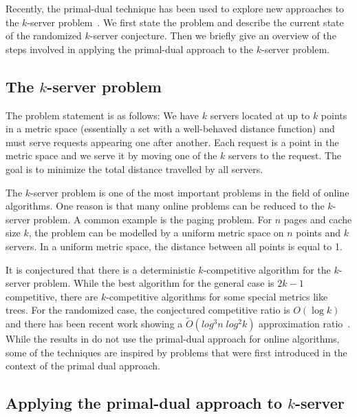 Recently, the primal-dual technique has been used to explore new approaches to the $k$-server problem~\cite{bansal10:k-server}.
We first state the problem and describe the current state of the randomized $k$-server conjecture.
Then we briefly give an overview of the steps involved in applying the primal-dual approach to the $k$-server problem.

\subsection{The $k$-server problem}
The problem statement is as follows:
We have $k$ servers located at up to $k$ points in a metric space (essentially a set with a well-behaved distance function) and must serve requests appearing one after another.
Each request is a point in the metric space and we serve it by moving one of the $k$ servers to the request.
The goal is to minimize the total distance travelled by all servers.

The $k$-server problem is one of the most important problems in the field of online algorithms.
One reason is that many online problems can be reduced to the $k$-server problem.
A common example is the paging problem. For $n$ pages and cache size $k$, the problem can be modelled by a uniform metric space on $n$ points and $k$ servers.
In a uniform metric space, the distance between all points is equal to 1.

It is conjectured that there is a deterministic $k$-competitive algorithm for the $k$-server problem.
While the best algorithm for the general case is $2k -1$ competitive, there are $k$-competitive algorithms for some special metrics like trees.
For the randomized case, the conjectured competitive ratio is $O(\log k)$ and there has been recent work showing a $\tilde{O}(log^3 n \; log^2 k)$ approximation ratio~\cite{bansal11:randomized-k-server}.
While the results in \cite{bansal11:randomized-k-server} do not use the primal-dual approach for online algorithms, some of the techniques are inspired by problems that were first introduced in the context of the primal dual approach.

\subsection{Applying the primal-dual approach to $k$-server}
